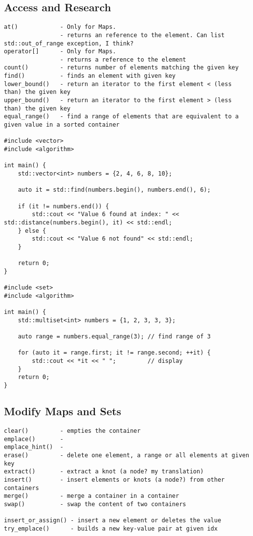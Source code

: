 \subsection{Access and Research}

\begin{verbatim}
at()            - Only for Maps.
                - returns an reference to the element. Can list std::out_of_range exception, I think? 
operator[]      - Only for Maps.
                - returns a reference to the element
count()         - returns number of elements matching the given key
find()          - finds an element with given key
lower_bound()   - return an iterator to the first element < (less than) the given key
upper_bound()   - return an iterator to the first element > (less than) the given key
equal_range()   - find a range of elements that are equivalent to a given value in a sorted container

#include <vector>
#include <algorithm>

int main() {
    std::vector<int> numbers = {2, 4, 6, 8, 10};

    auto it = std::find(numbers.begin(), numbers.end(), 6);

    if (it != numbers.end()) {
        std::cout << "Value 6 found at index: " << std::distance(numbers.begin(), it) << std::endl;
    } else {
        std::cout << "Value 6 not found" << std::endl;
    }

    return 0;
}

#include <set>
#include <algorithm>

int main() {
    std::multiset<int> numbers = {1, 2, 3, 3, 3};

    auto range = numbers.equal_range(3); // find range of 3

    for (auto it = range.first; it != range.second; ++it) {
        std::cout << *it << " ";         // display
    }
    return 0;
}
\end{verbatim}

\subsection{Modify Maps and Sets}

\begin{verbatim}
clear()         - empties the container
emplace()       -    
emplace_hint()  -  
erase()         - delete one element, a range or all elements at given key
extract()       - extract a knot (a node? my translation)
insert()        - insert elements or knots (a node?) from other containers
merge()         - merge a container in a container 
swap()          - swap the content of two containers 

insert_or_assign() - insert a new element or deletes the value
try_emplace()      - builds a new key-value pair at given idx
\end{verbatim}

